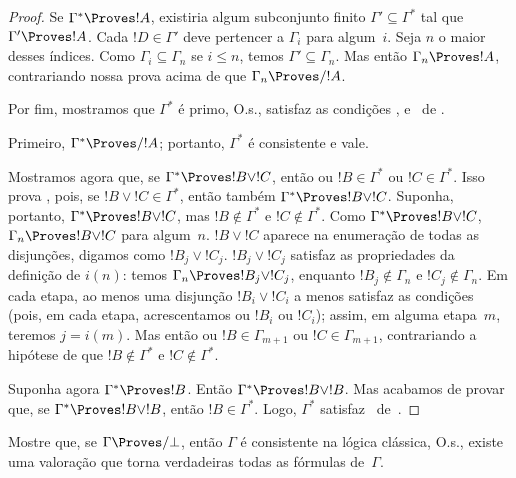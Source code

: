 \documentclass[../../../include/open-logic-section]{subfiles}
\begin{document}
\begin{proof}
  Se $\Gamma^* \Proves !A$, existiria algum subconjunto finito
  $\Gamma' \subseteq \Gamma^*$ tal que $\Gamma' \Proves !A$. Cada
  $!D \in \Gamma'$ deve pertencer a $\Gamma_i$ para algum~$i$. Seja
  $n$ o maior desses índices. Como $\Gamma_i \subseteq \Gamma_n$ se
  $i \le n$, temos $\Gamma' \subseteq \Gamma_n$. Mas então
  $\Gamma_n \Proves !A$, contrariando nossa prova acima de que
  $\Gamma_n \Proves/ !A$.

  Por fim, mostramos que $\Gamma^*$ é primo, O.s.\@, satisfaz as
  condições , 
  e~ de .

  Primeiro, $\Gamma^* \Proves/ !A$; portanto, $\Gamma^*$ é consistente
  e  vale.

  Mostramos agora que, se $\Gamma^* \Proves !B \lor !C$, então ou
  $!B \in \Gamma^*$ ou $!C \in \Gamma^*$. Isso prova
  , pois, se $!B \lor !C \in \Gamma^*$, então
  também $\Gamma^* \Proves !B \lor !C$. Suponha, portanto,
  $\Gamma^* \Proves !B \lor !C$, mas $!B \notin \Gamma^*$ e
  $!C \notin \Gamma^*$. Como $\Gamma^* \Proves !B \lor !C$,
  $\Gamma_n \Proves !B \lor !C$ para algum~$n$. $!B \lor !C$ aparece
  na enumeração de todas as disjunções, digamos como
  $!B_j \lor !C_j$. $!B_j \lor !C_j$ satisfaz as propriedades da
  definição de $i(n)$: temos $\Gamma_n \Proves !B_j \lor !C_j$,
  enquanto $!B_j \notin \Gamma_n$ e $!C_j \notin \Gamma_n$. Em cada
  etapa, ao menos uma disjunção $!B_i \lor !C_i$ a menos satisfaz as
  condições (pois, em cada etapa, acrescentamos ou $!B_i$ ou $!C_i$);
  assim, em alguma etapa~$m$, teremos $j = i(m)$. Mas então ou
  $!B \in \Gamma_{m+1}$ ou $!C \in \Gamma_{m+1}$, contrariando a
  hipótese de que $!B \notin \Gamma^*$ e $!C \notin \Gamma^*$.

  Suponha agora $\Gamma^* \Proves !B$. Então
  $\Gamma^* \Proves !B \lor !B$. Mas acabamos de provar que, se
  $\Gamma^* \Proves !B \lor !B$, então $!B \in \Gamma^*$. Logo,
  $\Gamma^*$ satisfaz~ de~.
\end{proof}

\begin{prob}
Mostre que, se $\Gamma \Proves/ \bot$, então $\Gamma$ é consistente na
lógica clássica, O.s.\@, existe uma valoração que torna verdadeiras
todas as fórmulas de~$\Gamma$.
\end{prob}
\end{document}
